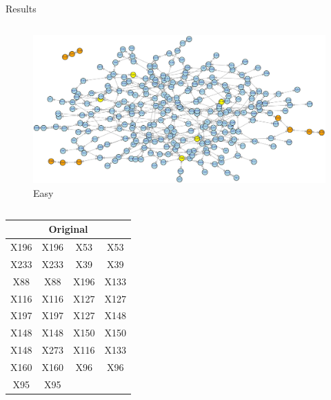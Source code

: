 \documentclass[final]{beamer} %
\newcommand{\boz}{\cellcolor{pathwaynode}}
\newcommand{\ghool}{\cellcolor{independentnode}}
\begin{document}
\begin{frame}{}
    \begin{block}{Results}
      \begin{columns}
        \begin{column}{0.25\textwidth}
          \begin{figure}
            \includegraphics[width=\textwidth]{synthesized-easy}
            \caption{\tiny Easy}
          \end{figure}
          \begin{columns}
            \begin{column}{0.5\textwidth}
              \center
              \tiny
              \begin{tabular}{| c c || c c |}
                \hline
                \toprule
                \multicolumn{4}{c}{Original} \\ 
                \midrule \hline
                \boz X196   &  \boz X196  &
                X53   &  X53  \\ \hline
                X233   &  X233   &
                X39   &  X39  \\ \hline
                \ghool X88   &  \ghool X88  &
                \boz X196   &  \boz X133  \\ \hline
                \boz X116   &  \boz X116  &
                X127   &  X127  \\ \hline
                X197   &  X197  &
                X127   &  X148  \\ \hline
                X148   &  X148  &
                \boz X150   &  \boz X150  \\ \hline
                X148   &  X273  &
                \boz X116   &  \boz X133  \\ \hline
                X160   &  X160  &
                \ghool X96   &  \ghool X96  \\ \hline
                X95   &  X95  &

\end{tabular}
\end{column}
\end{columns}
\end{column}
\end{columns}
\end{block}
\end{frame}
\end{document}
